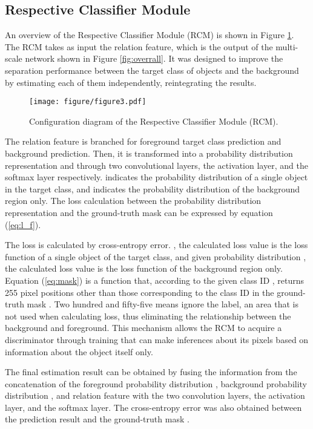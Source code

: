 \documentclass[runningheads]{llncs}
\begin{document}
\subsection{Respective Classifier Module}
An overview of the Respective Classifier Module (RCM) is shown in Figure \ref{fig:rcm}.
The RCM takes as input the relation feature, which is the output of the multi-scale network shown in Figure \ref{fig:overrall}.
It was designed to improve the separation performance between the target class of objects and the background by estimating each of them independently, reintegrating the results.
\begin{figure}[h]
  \texttt{[image: figure/figure3.pdf]}
  \caption{Configuration diagram of the Respective Classifier Module (RCM).}
  \label{fig:rcm}
\end{figure}
The relation feature  is branched for foreground target class prediction and background prediction. Then, it is transformed into a probability distribution representation  and  through two convolutional layers, the activation layer, and the softmax layer respectively.
 indicates the probability distribution of a single object in the target class, and  indicates the probability distribution of the background region only.
The loss calculation between the probability distribution representation  and the ground-truth mask  can be expressed by equation (\ref{eq:l_f}).


The loss is calculated by cross-entropy error.
, the calculated loss value  is the loss function of a single object of the target class, and given probability distribution , the calculated loss value  is the loss function of the background region only.
Equation (\ref{eq:mask}) is a function that, according to the given class ID , returns 255 pixel positions other than those corresponding to the class ID in the ground-truth mask .
Two hundred and fifty-five means ignore the label, an area that is not used when calculating loss, thus eliminating the relationship between the background and foreground.
This mechanism allows the RCM to acquire a discriminator through training that can make inferences about its pixels based on information about the object itself only.

The final estimation result  can be obtained by fusing the information from the concatenation of the foreground probability distribution , background probability distribution , and relation feature  with the two convolution layers, the activation layer, and the softmax layer.
The cross-entropy error  was also obtained between the prediction result  and the ground-truth mask .
\end{document}
